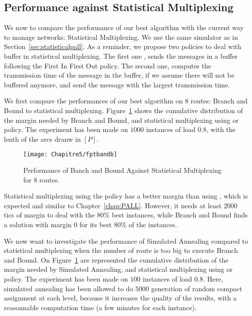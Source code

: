 \subsection{Performance against Statistical Multiplexing}

We now to compare the performance of our best algorithm with the current way to manage networks: Statistical Multiplexing. We use the same simulator as in Section~\ref{sec:statisticalpall}. As a reminder, we propose two policies to deal with buffer in statistical multiplexing. The first one \FIFO, sends the messages in a buffer following the First In First Out policy. The second one, \critdead computes the transmission time of the message in the buffer, if we assume there will not
be buffered anymore, and send the message with the largest transmission time.

We first compare the performances of our best algorithm on $8$ routes: Branch and Bound to statistical multiplexing. Figure~\ref{fig:fptbandb} shows the cumulative distribution of the margin needed by Branch and Bound, and statistical multiplexing using \FIFO or \critdead policy. The experiment has been made on $1000$ instances of load $0.8$, with the lenth of the arcs dranw in $[P]$.

\begin{center}

\begin{figure}[h]
  \centering
\texttt{[image: Chapitre5/fptbandb]}
\caption{Performance of Banch and Bound Against Statistical Multiplexing for $8$ routes.}
\label{fig:fptbandb}
\end{figure}
\end{center}

Statistical multiplexing using the \critdead policy has a better margin than using \FIFO,
which is expected and similar to Chapter~\ref{chap:PALL}. However, it needs at least $2000$ tics of margin 
to deal with the $80\%$ best instances, while Branch and Bound finds a solution with margin $0$ for its best $80\%$ of the instances.  

We now want to investigate the performance of Simulated Annealing compared to statistical multiplexing when the number of route is too big to execute Branch and Bound.
On Figure~\ref{fig:fptbandb} are represented the cumulative distribution of the margin needed by Simulated Annealing, and statistical multiplexing using \FIFO or \critdead policy. The experiment has been made on $100$ instances of load $0.8$. Here, simulated annealing has been allowed to do $5000$ generation of random compact assignment at each level, because it  increases the quality of the results, with a reasonnable computation time (a few minutes for each instance).



